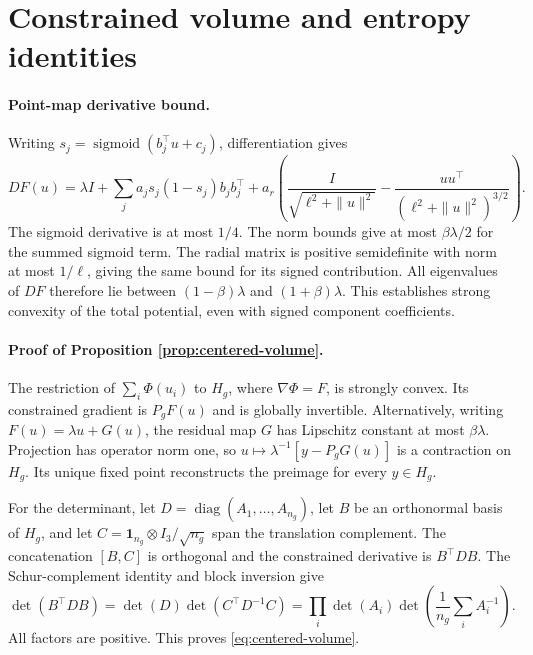 \section{Constrained volume and entropy identities}
\label{app:refinement-proofs}

\paragraph{Point-map derivative bound.}
Writing $s_j=\operatorname{sigmoid}(b_j^\top u+c_j)$, differentiation gives
\[
 DF(u)=\lambda I+\sum_j a_j s_j(1-s_j)b_jb_j^\top
 +a_r\left(\frac{I}{\sqrt{\ell^2+\|u\|^2}}
 -\frac{uu^\top}{(\ell^2+\|u\|^2)^{3/2}}\right).
\]
The sigmoid derivative is at most $1/4$. The norm bounds give at most
$\beta\lambda/2$ for the summed sigmoid term. The radial matrix is positive
semidefinite with norm at most $1/\ell$, giving the same bound for its signed
contribution. All eigenvalues of $DF$ therefore lie between
$(1-\beta)\lambda$ and $(1+\beta)\lambda$. This establishes strong convexity
of the total potential, even with signed component coefficients.

\paragraph{Proof of Proposition \ref{prop:centered-volume}.}
The restriction of $\sum_i\Phi(u_i)$ to $H_g$, where $\nabla\Phi=F$, is strongly
convex. Its constrained gradient is $P_gF(u)$ and is globally invertible.
Alternatively, writing $F(u)=\lambda u+G(u)$, the residual map $G$ has Lipschitz
constant at most $\beta\lambda$. Projection has operator norm one, so
$u\mapsto\lambda^{-1}[y-P_gG(u)]$ is a contraction on $H_g$. Its unique fixed
point reconstructs the preimage for every $y\in H_g$.

For the determinant, let $D=\operatorname{diag}(A_1,\ldots,A_{n_g})$,
let $B$ be an orthonormal basis of $H_g$, and let
$C=\mathbf1_{n_g}\otimes I_3/\sqrt{n_g}$ span the translation complement.
The concatenation $[B,C]$ is orthogonal and the constrained derivative is
$B^\top DB$. The Schur-complement identity and block inversion give
\[
 \det(B^\top DB)=\det(D)\det(C^\top D^{-1}C)
 =\prod_i\det(A_i)\det\left(\frac1{n_g}\sum_iA_i^{-1}\right).
\]
All factors are positive. This proves \eqref{eq:centered-volume}.

